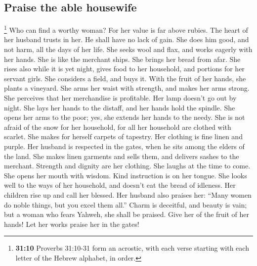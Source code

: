 \hypertarget{praise-the-able-housewife}{%
\subsection{Praise the able housewife}\label{praise-the-able-housewife}}

 \footnote{\textbf{31:10} Proverbs 31:10-31 form an
  acrostic, with each verse starting with each letter of the Hebrew
  alphabet, in order.} Who can find a worthy woman? For her value is far
above rubies.  The heart of her husband trusts in her. He
shall have no lack of gain.  She does him good, and not
harm, all the days of her life.  She seeks wool and flax,
and works eagerly with her hands.  She is like the
merchant ships. She brings her bread from afar.  She
rises also while it is yet night, gives food to her household, and
portions for her servant girls.  She considers a field,
and buys it. With the fruit of her hands, she plants a vineyard.
 She arms her waist with strength, and makes her arms
strong.  She perceives that her merchandise is
profitable. Her lamp doesn't go out by night.  She lays
her hands to the distaff, and her hands hold the spindle.
 She opens her arms to the poor; yes, she extends her
hands to the needy.  She is not afraid of the snow for
her household, for all her household are clothed with scarlet.
 She makes for herself carpets of tapestry. Her clothing
is fine linen and purple.  Her husband is respected in
the gates, when he sits among the elders of the land. 
She makes linen garments and sells them, and delivers sashes to the
merchant.  Strength and dignity are her clothing. She
laughs at the time to come.  She opens her mouth with
wisdom. Kind instruction is on her tongue.  She looks
well to the ways of her household, and doesn't eat the bread of
idleness.  Her children rise up and call her blessed. Her
husband also praises her:  ``Many women do noble things,
but you excel them all.''  Charm is deceitful, and beauty
is vain; but a woman who fears Yahweh, she shall be praised.
 Give her of the fruit of her hands! Let her works praise
her in the gates!
